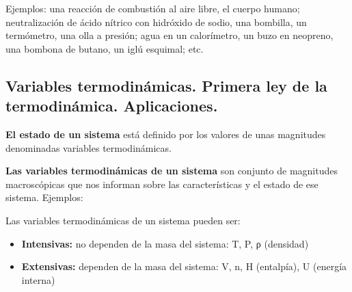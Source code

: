 \documentclass[
  spanish,
]{article}
\begin{document}
Ejemplos: una reacción de combustión al aire libre, el cuerpo humano;
neutralización de ácido nítrico con hidróxido de sodio, una bombilla, un
termómetro, una olla a presión; agua en un calorímetro, un buzo en
neopreno, una bombona de butano, un iglú esquimal; etc.

\hypertarget{variables-termodinuxe1micas.-primera-ley-de-la-termodinuxe1mica.-aplicaciones.}{%
\subsection{Variables termodinámicas. Primera ley de la termodinámica.
Aplicaciones.}\label{variables-termodinuxe1micas.-primera-ley-de-la-termodinuxe1mica.-aplicaciones.}}

\textbf{El estado de un sistema} está definido por los valores de unas
magnitudes denominadas variables termodinámicas.

\textbf{Las variables termodinámicas de un sistema} son conjunto de
magnitudes macroscópicas que nos informan sobre las características y el
estado de ese sistema. Ejemplos:

\hfill{}

\hfill{}

Las variables termodinámicas de un sistema pueden ser:

\begin{itemize}
\item
  \textbf{Intensivas:} no dependen de la masa del sistema: T, P, ρ
  (densidad)
\item
  \textbf{Extensivas:} dependen de la masa del sistema: V, n, H
  (entalpía), U (energía interna)
\end{itemize}
\end{document}
